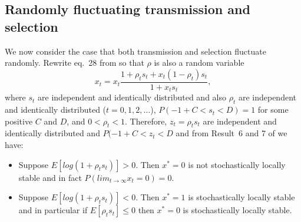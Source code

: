 \documentclass[12pt]{extarticle} %
\makeatletter
\renewcommand\section{\@startsection {section}{1}{\z@}%
     {-2.5ex \@plus -1ex \@minus -.2ex}%
     {1.3ex \@plus.2ex}%
    {\Large\bfseries}}
\makeatother
\begin{document}
\subsection*{Randomly fluctuating transmission and selection}

We now consider the case that both transmission and selection fluctuate randomly.
Rewrite eq.~28 from \citet{Ram2018} so that $\rho$ is also a random variable
\begin{equation}
x_t = x_t \frac{1 + \rho_t s_t + x_t (1 - \rho_t) s_t}{1 + x_t s_t},
\end{equation}
where $s_t$ are independent and identically distributed and also $\rho_t$ are independent and identically distributed ($t=0,1,2,\ldots$), $P(-1+C<s_t<D)=1$ for some positive $C$ and $D$, and $0<\rho_t<1$.
Therefore, $z_t = \rho_t s_t$  are independent and identically distributed and $P(-1+C < z_t < D$ and from Result~6 and 7 of \citet{Ram2018} we have:
\begin{itemize}
\item Suppose $E[log(1+\rho_t s_t)]>0$. Then $x^*=0$ is not stochastically locally stable and in fact $P(lim_{t \to \infty} x_t=0) = 0$.
\item Suppose $E[log(1+\rho_t s_t)]<0$. Then $x^*=1$ is stochastically locally stable and in particular if $E[\rho_t s_t] \le 0$ then $x^*=0$ is stochastically locally stable.
\end{itemize}



%


%

\end{document}
